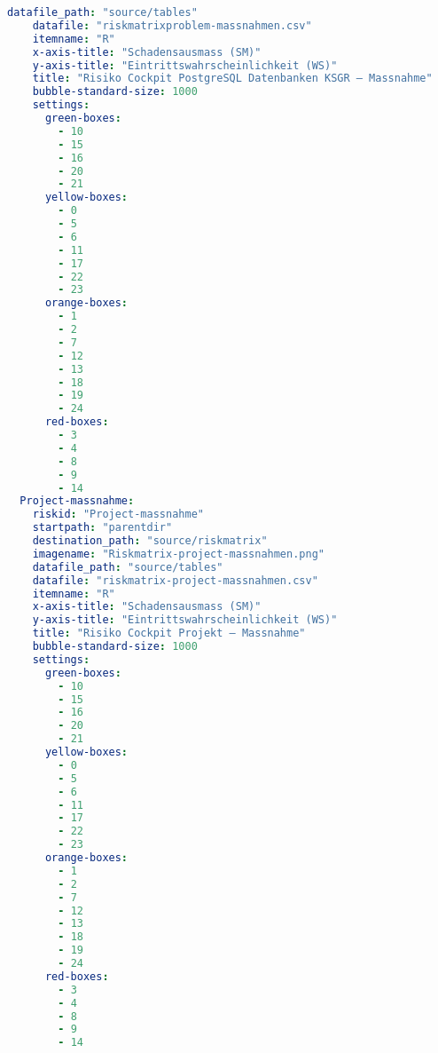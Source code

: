 \begin{lstlisting}[language=yaml, caption=Python LaTex - riskmatrix\_plotter\_conf.yaml - Konfigurationsdatei - Risxikomatrizen,captionpos=b,label={lst:riskmatrix_plotter_conf},breaklines=true]
    datafile_path: "source/tables"
    datafile: "riskmatrixproblem-massnahmen.csv"
    itemname: "R"
    x-axis-title: "Schadensausmass (SM)"
    y-axis-title: "Eintrittswahrscheinlichkeit (WS)"
    title: "Risiko Cockpit PostgreSQL Datenbanken KSGR – Massnahme"
    bubble-standard-size: 1000
    settings:
      green-boxes:
        - 10
        - 15
        - 16
        - 20
        - 21
      yellow-boxes:
        - 0
        - 5
        - 6
        - 11
        - 17
        - 22
        - 23
      orange-boxes:
        - 1
        - 2
        - 7
        - 12
        - 13
        - 18
        - 19
        - 24
      red-boxes:
        - 3
        - 4
        - 8
        - 9
        - 14
  Project-massnahme:
    riskid: "Project-massnahme"
    startpath: "parentdir"
    destination_path: "source/riskmatrix"
    imagename: "Riskmatrix-project-massnahmen.png"
    datafile_path: "source/tables"
    datafile: "riskmatrix-project-massnahmen.csv"
    itemname: "R"
    x-axis-title: "Schadensausmass (SM)"
    y-axis-title: "Eintrittswahrscheinlichkeit (WS)"
    title: "Risiko Cockpit Projekt – Massnahme"
    bubble-standard-size: 1000
    settings:
      green-boxes:
        - 10
        - 15
        - 16
        - 20
        - 21
      yellow-boxes:
        - 0
        - 5
        - 6
        - 11
        - 17
        - 22
        - 23
      orange-boxes:
        - 1
        - 2
        - 7
        - 12
        - 13
        - 18
        - 19
        - 24
      red-boxes:
        - 3
        - 4
        - 8
        - 9
        - 14
\end{lstlisting}